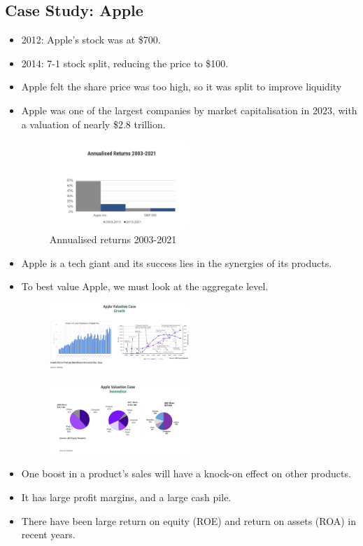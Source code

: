 \subsection*{Case Study: Apple}
\begin{itemize}
    \item 2012: Apple's stock was at \$700.
    \item 2014: 7-1 stock split, reducing the price to \$100.
    \item Apple felt the share price was too high, so it was split to improve liquidity
    \item Apple was one of the largest companies by market capitalisation in 2023, with a valuation of nearly \$2.8 trillion.
     \begin{figure}[H]
        \centering
        \includegraphics[width=0.5\textwidth]{img/4.3.png}
        \caption{Annualised returns 2003-2021}
    \end{figure}
    \item Apple is a tech giant and its success lies in the synergies of its products.
    \item To best value Apple, we must look at the aggregate level.
     \begin{figure}[H]
        \centering
        \includegraphics[width=0.5\textwidth]{img/4.4.png}
    \end{figure}
    \begin{figure}[H]
        \centering
        \includegraphics[width=0.5\textwidth]{img/4.5.png}
    \end{figure}
    \item One boost in a product's sales will have a knock-on effect on other products.
    \item It has large profit margins, and a large cash pile.
    \item There have been large return on equity (ROE) and return on assets (ROA) in recent years.
    

\end{itemize}


